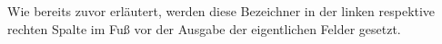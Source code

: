 \begin{Bundle*}[v2.05]{}
\begin{Declaration}{}
\begin{Declaration}{}
\begin{Declaration}{}
\printdeclarationlist%
%
Wie bereits zuvor erläutert, werden diese Bezeichner in der linken respektive 
rechten Spalte im Fuß vor der Ausgabe der eigentlichen Felder gesetzt.
\end{Declaration}
\end{Declaration}
\end{Declaration}
\end{Bundle*}
